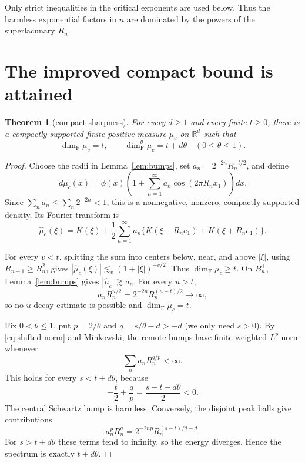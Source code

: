\documentclass[11pt]{article}
\newtheorem{theorem}{Theorem}
\newcommand{\R}{\mathbb R}
\newcommand{\Fdim}{\dim_{\mathrm F}}
\begin{document}
Only strict inequalities in the critical exponents are used below. Thus
the harmless exponential factors in $n$ are dominated by the powers of
the superlacunary $R_n$.

\section{The improved compact bound is attained}

\begin{theorem}[compact sharpness]\label{thm:compact-sharp}
For every $d\ge1$ and every finite $t\ge0$, there is a compactly
supported finite positive measure $\mu_c$ on $\R^d$ such that
\[
 \Fdim\mu_c=t,
 \qquad
 \dim_{\mathrm F}^{\theta}\mu_c=t+d\theta
 \quad(0\le\theta\le1).
\]
\end{theorem}

\begin{proof}
Choose the radii in Lemma~\ref{lem:bumps}, set
\(a_n=2^{-2n}R_n^{-t/2}\), and define
\begin{equation}\label{eq:compact-measure}
 d\mu_c(x)=\phi(x)
 \left(1+\sum_{n=1}^\infty a_n\cos(2\pi R_nx_1)\right)dx.
\end{equation}
Since $\sum_na_n\le\sum_n2^{-2n}<1$, this is a nonnegative,
nonzero, compactly supported density. Its Fourier transform is
\begin{equation}\label{eq:compact-transform}
 \widehat\mu_c(\xi)=K(\xi)+\frac12\sum_{n=1}^\infty a_n
 \{K(\xi-R_ne_1)+K(\xi+R_ne_1)\}.
\end{equation}

For every $v<t$, splitting the sum into centers below, near, and above
\(|\xi|\), using $R_{n+1}\ge R_n^2$, gives
\(|\widehat\mu_c(\xi)|\lesssim_v(1+|\xi|)^{-v/2}\). Thus
\(\Fdim\mu_c\ge t\). On $B_n^+$, Lemma~\ref{lem:bumps} gives
\(|\widehat\mu_c|\gtrsim a_n\). For every $u>t$,
\[
 a_nR_n^{u/2}=2^{-2n}R_n^{(u-t)/2}\longrightarrow\infty,
\]
so no $u$-decay estimate is possible and $\Fdim\mu_c=t$.

Fix $0<\theta\le1$, put $p=2/\theta$ and
\(q=s/\theta-d>-d\) (we only need $s>0$). By
\eqref{eq:shifted-norm} and Minkowski, the remote bumps have finite weighted
\(L^p\)-norm whenever
\[
 \sum_n a_nR_n^{q/p}<\infty.
\]
This holds for every $s<t+d\theta$, because
\[
 -\frac t2+\frac qp=\frac{s-t-d\theta}{2}<0.
\]
The central Schwartz bump is harmless. Conversely, the disjoint peak balls
give contributions
\[
 a_n^pR_n^q
 =2^{-2np}R_n^{(s-t)/\theta-d}.
\]
For $s>t+d\theta$ these terms tend to infinity, so the energy diverges.
Hence the spectrum is exactly $t+d\theta$.
\end{proof}
\end{document}
